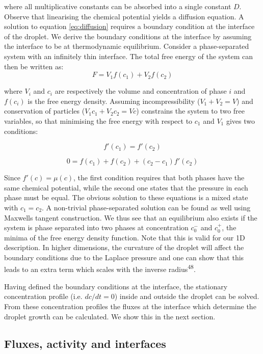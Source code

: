 \documentclass{Dissertate}
\begin{document}
where all multiplicative constants can be absorbed into a single constant $D$. Observe that linearising the chemical potential yields a diffusion equation. A solution to equation \ref{eq:diffusion} requires a boundary condition at the interface of the droplet. We derive the boundary conditions at the interface by assuming the interface to be at thermodynamic equilibrium. Consider a phase-separated system with an infinitely thin interface. The total free
energy of the system can then be written as: \[
F = V_1 f(c_1) + V_2 f(c_2)
\]

where \(V_i\) and \(c_i\) are respectively the volume and
concentration of phase \(i\) and \(f(c_i)\) is the free energy
density. Assuming incompressibility (\(V_1+V_2=V\)) and conservation of
particles (\(V_1c_1+V_2c_2=Vc\)) constrains the system to two
free variables, so that minimising the free energy with respect to
\(c_1\) and \(V_1\) gives two conditions:

\[
f'(c_1) = f'(c_2)
\]

\[
0 = f(c_1) + f(c_2) + (c_2-c_1)f'(c_2)
\]

Since \(f'(c) = \mu(c)\), the first condition requires that both
phases have the same chemical potential, while the second one
states that the pressure in each phase must be equal. The obvious solution
to these equations is a mixed state with \(c_1=c_2\). A
non-trivial phase-separated solution can be found as well using Maxwells tangent construction. We thus see that an equilibrium also exists if the system is phase separated into two phases at concentration $c_0^-$ and $c_0^+$, the minima of the free energy density function. Note that this is valid for our 1D description. In higher dimensions, the curvature of the droplet will affect the boundary conditions due to the Laplace pressure and one can show that this leads to an extra term which scales with the inverse radius\textsuperscript{48}.

Having defined the boundary conditions at the interface, the stationary concentration profile (i.e. $dc/dt=0$) inside and outside the droplet can be solved. From these concentration profiles the fluxes at the interface which determine the droplet growth can be calculated. We show this in the next section.


\hypertarget{fluxes-activity-and-interfaces}{%
\subsection{Fluxes, activity and
interfaces}\label{fluxes-activity-and-interfaces}}
\end{document}
